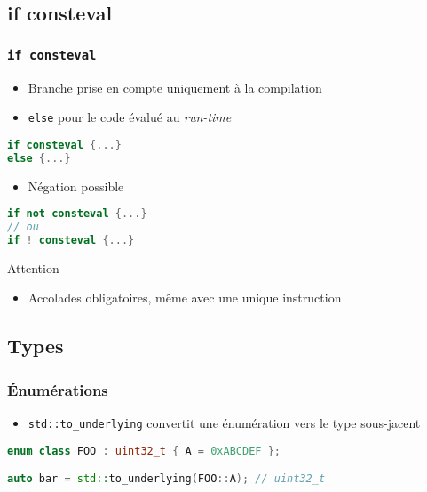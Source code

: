 \documentclass[C++.tex]{subfiles}
\begin{document}
\subsection*{if consteval}
\begin{frame}[fragile]
	\frametitle{\lstinline|if consteval|}
	\begin{itemize}
		\item Branche prise en compte uniquement à la compilation
		\item \lstinline|else| pour le code évalué au \textit{run-time}
	\end{itemize}

	\begin{lstlisting}[language=C++]
if consteval {...}
else {...}\end{lstlisting}

	\begin{itemize}
		\item Négation possible
	\end{itemize}

	\begin{lstlisting}[language=C++]
if not consteval {...}
// ou
if ! consteval {...}\end{lstlisting}

	\begin{alertblock}{Attention}
		\begin{itemize}
			\item Accolades obligatoires, même avec une unique instruction
		\end{itemize}
	\end{alertblock}
\end{frame}

\subsection*{Types}
\begin{frame}[fragile]
	\frametitle{Énumérations}
	\begin{itemize}
		\item \lstinline|std::to_underlying| convertit une énumération vers le type sous-jacent

	\end{itemize}

	\begin{lstlisting}[language=C++]
enum class FOO : uint32_t { A = 0xABCDEF };

auto bar = std::to_underlying(FOO::A); // uint32_t\end{lstlisting}
\end{frame}
\end{document}
